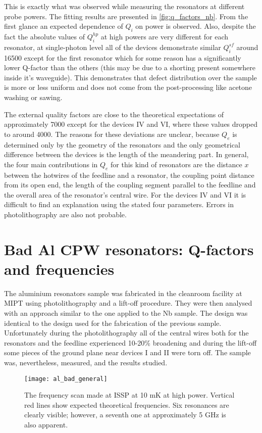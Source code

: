 \documentclass[12pt]{article}
\numberwithin{equation}{section}
\numberwithin{figure}{section}
\begin{document}
This is exactly what was observed while measuring the resonators at different probe powers. The fitting results are presented in \autoref{fig:q_factors_nb}. From the first glance an expected dependence of $Q_i$ on power is observed. Also, despite the fact the absolute values of $Q_i^{hp}$ at high powers are very different for each resonator, at single-photon level all of the devices demonstrate similar $Q_i^{sf}$ around 16500 except for the first resonator which for some reason has a significantly lower Q-factor than the others (this may be due to a shorting present somewhere inside it's waveguide). This demonstrates that defect distribution over the sample is more or less uniform and does not come from the post-processing like acetone washing or sawing.

The external quality factors are close to the theoretical expectations of approximately 7000 except for the devices IV and VI, where these values dropped to around 4000. The reasons for these deviations are unclear, because $Q_e$ is determined only by the geometry of the resonators and the only geometrical difference between the devices is the length of the meandering part. In general, the four main contributions in $Q_e$ for this kind of resonators are the distance $x$ between the hotwires of the feedline and a resonator, the coupling point distance from its open end, the length of the coupling segment parallel to the feedline and the overall area of the resonator's central wire. For the devices IV and VI it is difficult to find an explanation using the stated four parameters. Errors in photolithography are also not probable.

\section{Bad Al CPW resonators: Q-factors and frequencies}

The aluminium resonators sample was fabricated in the cleanroom facility at MIPT using photolithography and a lift-off procedure. They were then analysed with an approach similar to the one applied to the Nb sample. The design was identical to the design used for the fabrication of the previous sample. Unfortunately during the photolithography all of the central wires both for the resonators and the feedline experienced 10-20\% broadening and during the lift-off some pieces of the ground plane near devices I and II were torn off. The sample was, nevertheless, measured, and the results studied.

\begin{figure}[h]
\centering
\texttt{[image: al\_bad\_general]}
\caption{The frequency scan made at ISSP at 10 mK at high power. Vertical red lines show expected theoretical frequencies. Six resonances are clearly visible; however, a seventh one at approximately 5 GHz is also apparent.}
\label{fig:al_general}
\end{figure}
\end{document}

